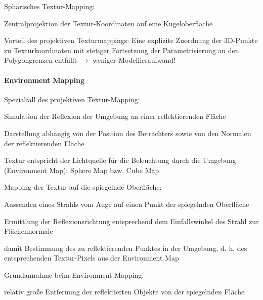 \documentclass[landscape]{article}
\begin{document}
\begin{multicols}{3}
  Sphärisches Textur-Mapping:
  \begin{itemize*}
    \item Zentralprojektion der Textur-Koordinaten auf eine Kugeloberfläche
    \item Vorteil des projektiven Texturmappings: Eine explizite Zuordnung der 3D-Punkte zu Texturkoordinaten mit stetiger Fortsetzung der Parametrisierung an den Polygongrenzen entfällt $\rightarrow$ weniger Modellieraufwand!
  \end{itemize*}
  
  \paragraph{Environment Mapping}
  Spezialfall des projektiven Textur-Mapping:
  \begin{itemize*}
    \item Simulation der Reflexion der Umgebung an einer reflektierenden Fläche
    \item Darstellung abhängig von der Position des Betrachters sowie von den Normalen der reflektierenden Fläche
    \item Textur entspricht der Lichtquelle für die Beleuchtung durch die Umgebung (Environment Map): Sphere Map bzw. Cube Map
  \end{itemize*}
  
  Mapping der Textur auf die spiegelnde Oberfläche:
  \begin{itemize*}
    \item Aussenden eines Strahls vom Auge auf einen Punkt der spiegelnden Oberfläche
    \item Ermittlung der Reflexionsrichtung entsprechend dem Einfallswinkel des Strahl zur Flächennormale
    \item damit Bestimmung des zu reflektierenden Punktes in der Umgebung, d. h. des entsprechenden Textur-Pixels aus der Environment Map
  \end{itemize*}
  
  Grundannahme beim Environment Mapping:
  \begin{itemize*}
    \item relativ große Entfernung der reflektierten Objekte von der spiegelnden Fläche
  \end{itemize*}
  

\end{multicols}
\end{document}
